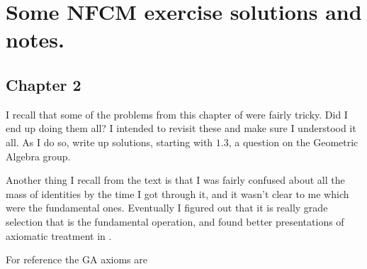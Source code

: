 
%
%





\chapter{Some NFCM exercise solutions and notes. }
\date{ Nov 27, 2008.  Last Revision: $Date: 2009/06/04 12:52:02 $ }

%


\section{Chapter 2 }

I recall that some of the problems from this chapter of
\cite{hestenes1999nfc}
were fairly tricky.  Did I end up doing them all?  I intended to
revisit these and make sure I understood it all.  As I do so, write up
solutions, starting with $1.3$, a question on the Geometric Algebra group.

Another thing I recall from the text is that I was fairly confused about
all the mass of identities by the time I got through it, and it wasn't clear
to me which were the fundamental ones.
Eventually I figured out that it is
really grade selection that is the fundamental operation, and
found better presentations of axiomatic treatment in \cite{doran2003gap}.

For reference the GA axioms are

